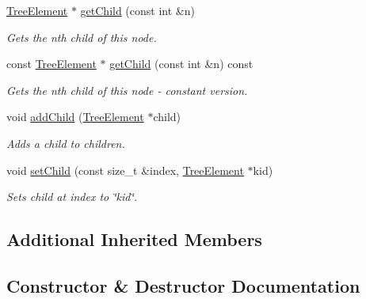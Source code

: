 \begin{DoxyCompactItemize}
\hyperlink{classbridges_1_1datastructure_1_1_tree_element}{Tree\+Element} $\ast$ \hyperlink{classbridges_1_1datastructure_1_1_tree_element_a7b4c553cd11b169fa4ab5c3dacc371a1}{get\+Child} (const int \&n)
\begin{DoxyCompactList}\small\item\em Gets the nth child of this node. \end{DoxyCompactList}\item 
const \hyperlink{classbridges_1_1datastructure_1_1_tree_element}{Tree\+Element} $\ast$ \hyperlink{classbridges_1_1datastructure_1_1_tree_element_a858d9ce29eb7256d058e8ee2daf4ef4f}{get\+Child} (const int \&n) const
\begin{DoxyCompactList}\small\item\em Gets the nth child of this node -\/ constant version. \end{DoxyCompactList}\item 
void \hyperlink{classbridges_1_1datastructure_1_1_tree_element_a4c05db5e970707e1421fe664bc4ef3b7}{add\+Child} (\hyperlink{classbridges_1_1datastructure_1_1_tree_element}{Tree\+Element} $\ast$child)
\begin{DoxyCompactList}\small\item\em Adds a child to children. \end{DoxyCompactList}\item 
void \hyperlink{classbridges_1_1datastructure_1_1_tree_element_ad894ec5edfa66ddf59dd83a8712b48f1}{set\+Child} (const size\+\_\+t \&index, \hyperlink{classbridges_1_1datastructure_1_1_tree_element}{Tree\+Element} $\ast$kid)
\begin{DoxyCompactList}\small\item\em Sets child at index to \char`\"{}kid\char`\"{}. \end{DoxyCompactList}\end{DoxyCompactItemize}
\subsection*{Additional Inherited Members}


\subsection{Constructor \& Destructor Documentation}
\mbox{\label{classbridges_1_1datastructure_1_1_tree_element_a0d719458938ba46a509635591ba2290b}} 
